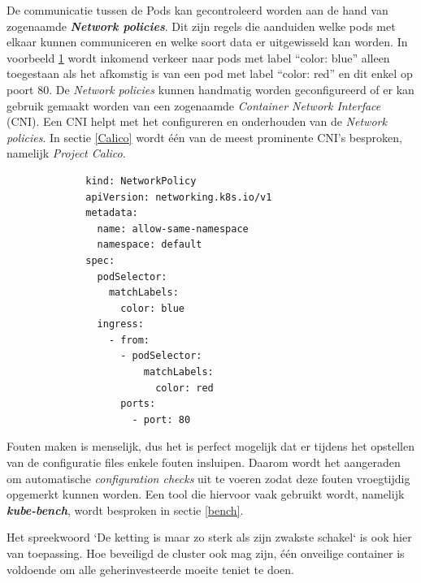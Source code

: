 De communicatie tussen de Pods kan gecontroleerd worden aan de hand van zogenaamde \textbf{\textit{Network policies}}. Dit zijn regels die aanduiden welke pods met elkaar kunnen communiceren en welke soort data er uitgewisseld kan worden. In voorbeeld \ref{netpolicy} wordt inkomend verkeer naar pods met label ``color: blue'' alleen toegestaan als het afkomstig is van een pod met label ``color: red'' en dit enkel op poort 80. De \textit{Network policies} kunnen handmatig worden geconfigureerd of er kan gebruik gemaakt worden van een zogenaamde \textit{Container Network Interface} (CNI). Een CNI helpt met het configureren en onderhouden van de \textit{Network policies}. In sectie \ref{Calico} wordt één van de meest prominente CNI's besproken, namelijk \textit{Project Calico}.

\begin{figure}[h!] \label{netpolicy}
    \begin{verbatim}
        kind: NetworkPolicy
        apiVersion: networking.k8s.io/v1
        metadata:
          name: allow-same-namespace
          namespace: default
        spec:
          podSelector:
            matchLabels:
              color: blue
          ingress:
            - from:
              - podSelector:
                  matchLabels:
                    color: red
              ports:
                - port: 80
    \end{verbatim}
\end{figure}

Fouten maken is menselijk, dus het is perfect mogelijk dat er tijdens het opstellen van de configuratie files enkele fouten insluipen. Daarom wordt het aangeraden om automatische \textit{configuration checks} uit te voeren zodat deze fouten vroegtijdig opgemerkt kunnen worden. Een tool die hiervoor vaak gebruikt wordt, namelijk \textbf{\textit{kube-bench}}, wordt besproken in sectie \ref{bench}.


Het spreekwoord `De ketting is maar zo sterk als zijn zwakste schakel` is ook hier van toepassing. Hoe beveiligd de cluster ook mag zijn, één onveilige container is voldoende om alle geherinvesteerde moeite teniet te doen.

